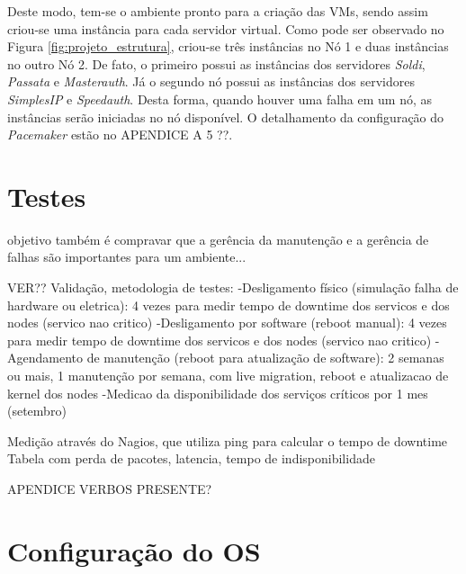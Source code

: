 
Deste modo, tem-se o ambiente pronto para a criação das \acp{VM}, sendo assim criou-se uma instância para cada servidor virtual. 
Como pode ser observado no Figura \ref{fig:projeto_estrutura}, criou-se três instâncias no Nó 1 e duas instâncias no outro Nó 2. De fato, o 
primeiro possui as instâncias dos servidores \textit{Soldi}, \textit{Passata} e \textit{Masterauth}. Já o segundo nó possui as instâncias dos 
servidores \textit{SimplesIP} e \textit{Speedauth}. Desta forma, quando houver uma falha em um nó, as instâncias serão iniciadas no nó disponível.
O detalhamento da configuração do \textit{Pacemaker} estão no APENDICE A 5 ??.


\section{Testes}
\label{section:testes}

objetivo também é compravar que a gerência da manutenção e a gerência de falhas são importantes para um ambiente...

VER??
Validação, metodologia de testes:
-Desligamento físico (simulação falha de hardware ou eletrica): 4 vezes para medir tempo de downtime dos servicos e dos nodes (servico nao critico)
-Desligamento por software (reboot manual): 4 vezes para medir tempo de downtime dos servicos e dos nodes (servico nao critico)
-Agendamento de manutenção (reboot para atualização de software): 2 semanas ou mais, 1 manutenção por semana, com live migration, reboot e 
atualizacao de kernel dos nodes
-Medicao da disponibilidade dos serviços críticos por 1 mes (setembro)

Medição através do Nagios, que utiliza ping para calcular o tempo de downtime
Tabela com perda de pacotes, latencia, tempo de indisponibilidade



APENDICE
VERBOS PRESENTE?

\section{Configuração do \ac{OS}}

